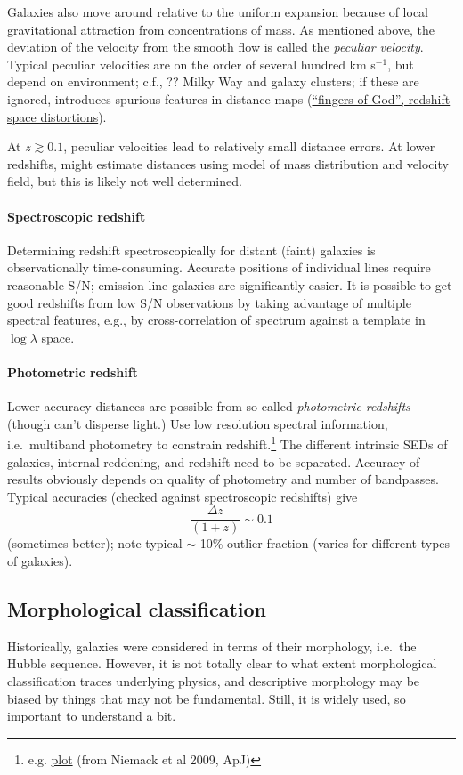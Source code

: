 \documentclass{article}
\newcommand{\mynotes}[1]{\textcolor{cadmiumorange}{#1}}
\begin{document}
Galaxies also move around relative to the uniform expansion because of local
gravitational attraction from concentrations of mass.
As mentioned above, the deviation of the
velocity from the smooth flow is called the \textit{peculiar velocity}.
Typical peculiar velocities are on the order of several hundred km s$^{-1}$,
but depend on environment; c.f., \mynotes{??}
Milky Way and galaxy clusters; if these are ignored, introduces spurious
features in distance maps
(\href{http://astronomy.nmsu.edu/holtz/a555/resources/cfa.html}
{``fingers of God'', redshift space distortions}).

At $z \gtrsim 0.1$, peculiar velocities lead to relatively small distance
errors. At lower redshifts, might estimate distances using model of mass
distribution and velocity field, but this is likely not well determined.

\paragraph{Spectroscopic redshift}
Determining redshift spectroscopically for distant (faint) galaxies is
observationally time-consuming. Accurate positions of individual lines
require reasonable S/N; emission line galaxies are significantly easier.
It is possible to get good redshifts from low
S/N observations by taking advantage of multiple spectral features,
e.g., by cross-correlation of spectrum against a template
in $\log\lambda$ space.

\paragraph{Photometric redshift}
Lower accuracy distances are possible from so-called \textit{photometric
redshifts} \mynotes{(though can't disperse light.)}
Use low resolution spectral
information, i.e.\ multiband photometry to constrain redshift.\footnote{
    e.g. \href{http://astronomy.nmsu.edu/holtz/a555/resources/photoz.png}
    {plot} (from Niemack et al 2009, ApJ)}
The different intrinsic SEDs of galaxies, internal reddening, and
redshift need to be separated.
Accuracy of results obviously depends on quality of photometry
and number of bandpasses. Typical accuracies (checked against spectroscopic
redshifts) give
\[
    \frac{\Delta{z}}{\left(1+z\right)} \sim 0.1
    \]
(sometimes better); note typical $\sim$ 10\% outlier fraction
(varies for different types of galaxies).

\subsection{Morphological classification}
Historically, galaxies were considered in terms of their morphology, i.e.\ the
Hubble sequence.  However, it is not totally clear to what extent morphological
classification traces underlying physics, and descriptive morphology may be
biased by things that may not be fundamental.  Still, it is widely used, so
important to understand a bit.
\end{document}
